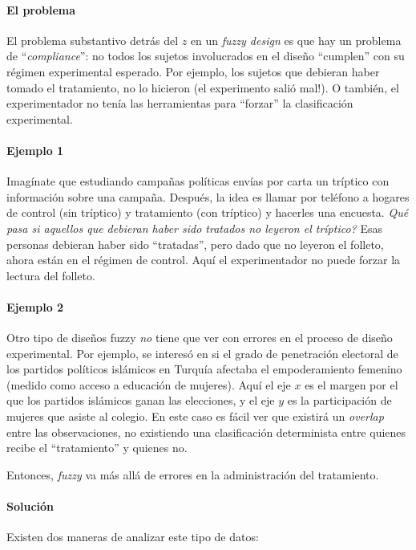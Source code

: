 \documentclass[onesided]{article}\usepackage[]{graphicx}\usepackage[]{color}
\begin{document}
\paragraph{El problema}El problema substantivo detr\'as del $z$ en un \emph{fuzzy design} es que hay un problema de ``\emph{compliance}'': no todos los sujetos involucrados en el dise\~no ``cumplen'' con su r\'egimen experimental esperado. Por ejemplo, los sujetos que debieran haber tomado el tratamiento, no lo hicieron (el experimento sali\'o mal!). O tambi\'en, el experimentador no ten\'ia las herramientas para ``forzar'' la clasificaci\'on experimental. 

\paragraph{Ejemplo 1}Imag\'inate que estudiando campa\~nas pol\'iticas env\'ias por carta un tr\'iptico con informaci\'on sobre una campa\~na. Despu\'es, la idea es llamar por tel\'efono a hogares de control (sin tr\'iptico) y tratamiento (con tr\'iptico) y hacerles una encuesta. \emph{Qu\'e pasa si aquellos que debieran haber sido tratados no leyeron el tr\'iptico?} Esas personas debieran haber sido ``tratadas'', pero dado que no leyeron el folleto, ahora est\'an en el r\'egimen de control. Aqu\'i el experimentador no puede forzar la lectura del folleto. 

\paragraph{Ejemplo 2}Otro tipo de dise\~nos fuzzy \emph{no} tiene que ver con errores en el proceso de dise\~no experimental. Por ejemplo, \textcite[244]{ErikMe2014} se interes\'o en si el grado de penetraci\'on electoral de los partidos pol\'iticos isl\'amicos en Turqu\'ia afectaba el empoderamiento femenino (medido como acceso a educaci\'on de mujeres). Aqu\'i el eje $x$ es el margen por el que los partidos isl\'amicos ganan las elecciones, y el eje $y$ es la participaci\'on de mujeres que asiste al colegio. En este caso es f\'acil ver que existir\'a un \emph{overlap} entre las observaciones, no existiendo una clasificaci\'on determinista entre quienes recibe el ``tratamiento'' y quienes no.


Entonces, \emph{fuzzy} va m\'as all\'a de errores en la administraci\'on del tratamiento.

\paragraph{Soluci\'on} Existen dos maneras de analizar este tipo de datos:
\end{document}
